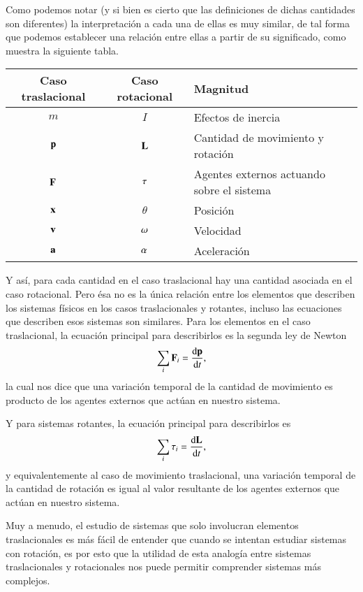 Como podemos notar (y si bien es cierto que las definiciones de dichas cantidades son diferentes) la interpretación a cada una de ellas es muy similar, de tal forma que podemos establecer una relación entre ellas a partir de su significado, como muestra la siguiente tabla.
\begin{center}
\begin{tabular}{c|c|l}
\hline
Caso traslacional & Caso rotacional & Magnitud\\
\hline \hline
$m$ & $I$ & Efectos de inercia \\
\hline
$\vb{p}$ & $\vb{L}$  & Cantidad de movimiento y rotación \\
\hline
$\vb{F}$ & $\vb{\tau}$ & Agentes externos actuando sobre el sistema \\
\hline
$\vb{x}$ & $\theta$ & Posición \\
\hline
$\vb{v}$ & $\vb{\omega}$ & Velocidad \\
\hline
$\vb{a}$ & $\vb{\alpha}$ & Aceleración\\
\hline
\end{tabular}
\end{center}

Y así, para cada cantidad en el caso traslacional hay una cantidad asociada en el caso rotacional. Pero ésa no es la única relación entre los elementos que describen los sistemas físicos en los casos traslacionales y rotantes, incluso las ecuaciones que describen esos sistemas son similares. Para los elementos en el caso traslacional, la ecuación principal para describirlos es la segunda ley de Newton
\begin{equation}
\sum_i \vb{F}_i = \dv{\vb{p}}{t},
\end{equation}
la cual nos dice que una variación temporal de la cantidad de movimiento es producto de los agentes externos que actúan en nuestro sistema. 

Y para sistemas rotantes, la ecuación principal para describirlos es
\begin{equation}
\sum_i \vb{\tau}_i = \dv{\vb{L}}{t},
\end{equation}
y equivalentemente al caso de movimiento traslacional, una variación temporal de la cantidad de rotación es igual al valor resultante de los agentes externos que actúan en nuestro sistema.

Muy a menudo, el estudio de sistemas que solo involucran elementos traslacionales es más fácil de entender que cuando se intentan estudiar sistemas con rotación, es por esto que la utilidad de esta analogía entre sistemas traslacionales y rotacionales nos puede permitir comprender sistemas más complejos. 

